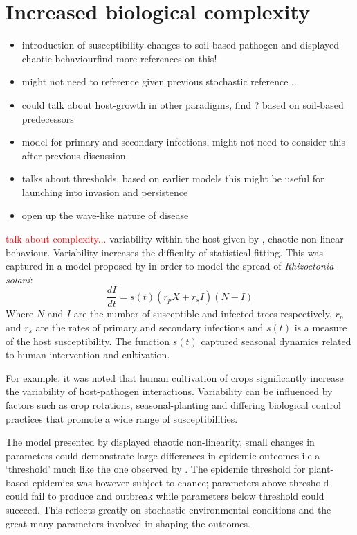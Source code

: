 \section{Increased biological complexity}
\begin{itemize}
    \item \cite{doi:10.1098/rspb.1996.0116} introduction of susceptibility changes to soil-based pathogen and displayed chaotic behaviour\textemdash find more references on this!
    \item might not need to reference \cite{doi:10.1098/rspb.1996.0116} given previous stochastic reference \cite{gilligan1985probability}..
    \item could talk about host-growth in other paradigms, find ? based on soil-based predecessors
    \item \cite{doi:10.1098/rstb.1997.0040} model for primary and secondary infections, might not need to consider this after previous discussion.
    \item \cite{GUBBINS2000219} talks about thresholds, based on earlier models this might be useful for launching into invasion and persistence 
    \item open up the wave-like nature of disease 
\end{itemize}

\textcolor{red}{talk about complexity...}
variability within the host given by \cite{doi:10.1098/rspb.1996.0116}, chaotic non-linear behaviour. Variability increases the difficulty of statistical fitting.
This was captured in a model proposed by \cite{doi:10.1098/rspb.1996.0116} in order to model the spread of \textit{Rhizoctonia solani}:
\begin{equation}
\label{eq:early-model}
    \frac{dI}{dt} = s(t)(r_pX + r_sI)(N-I)
\end{equation}
Where $N$ and $I$ are the number of susceptible and infected trees respectively, $r_p$ and $r_s$ are the rates of primary and secondary infections and $s(t)$ is a measure of the host susceptibility. The function $s(t)$ captured seasonal dynamics related to human intervention and cultivation.

For example, it was noted that human cultivation of crops significantly increase the variability of host-pathogen interactions. Variability can be influenced by factors such as crop rotations, seasonal-planting and differing biological control practices that promote a wide range of susceptibilities.

The model presented by \cite{doi:10.1098/rspb.1996.0116} displayed chaotic non-linearity, small changes in parameters could demonstrate large differences in epidemic outcomes i.e a `threshold' much like the one observed by \cite{kermack-model}. The epidemic threshold for plant-based epidemics was however subject to chance; parameters above threshold could fail to produce and outbreak while parameters below threshold could succeed. This reflects greatly on stochastic environmental conditions and the great many parameters involved in shaping the outcomes.

